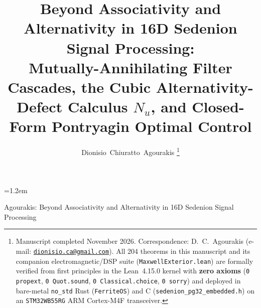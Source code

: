 \documentclass[journal,twoside]{IEEEtran}
\theoremstyle{definition}
\theoremstyle{remark}
\begin{document}
\emergencystretch=1.2em

\title{Beyond Associativity and Alternativity in 16D Sedenion Signal Processing:\\
Mutually-Annihilating Filter Cascades, the Cubic Alternativity-Defect Calculus $N_u$, and Closed-Form Pontryagin Optimal Control}

\author{Dionisio~Chiuratto~Agourakis%
\thanks{Manuscript completed November 2026. Correspondence: D.~C.~Agourakis (e-mail: \href{mailto:dionisio.ca@gmail.com}{\texttt{dionisio.ca@gmail.com}}). All 204 theorems in this manuscript and its companion electromagnetic/DSP suite (\texttt{MaxwellExterior.lean}) are formally verified from first principles in the Lean~4.15.0 kernel with \textbf{zero axioms} (\texttt{0 propext}, \texttt{0 Quot.sound}, \texttt{0 Classical.choice}, \texttt{0 sorry}) and deployed in bare-metal \texttt{no\_std} Rust (\texttt{FerriteOS}) and C (\texttt{sedenion\_pg32\_embedded.h}) on an \texttt{STM32WB55RG} ARM Cortex-M4F transceiver.}}

%
{Agourakis: Beyond Associativity and Alternativity in 16D Sedenion Signal Processing}

\maketitle
\end{document}
